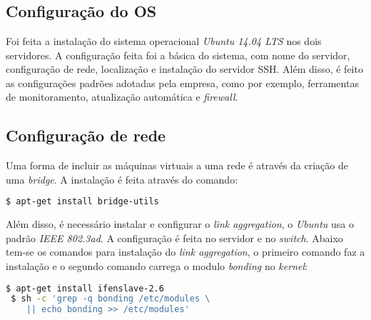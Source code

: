 
\chapter{}
\label{cap:apconfiguracao}

\section{Configuração do \ac{OS}}
\label{ap:confos}

Foi feita a instalação do sistema operacional \textit{Ubuntu 14.04 \ac{LTS}} nos dois servidores. A configuração feita foi a básica do sistema,
com nome do servidor, configuração de rede, localização e instalação do servidor \ac{SSH}.
Além disso, é feito as configurações padrões adotadas pela empresa, como por exemplo, ferramentas de monitoramento, atualização automática
e \textit{firewall}.

\section{Configuração de rede}
\label{ap:confrede}

Uma forma de incluir as máquinas virtuais a uma rede é através da criação de uma \textit{bridge}. A instalação é feita através do comando:
\begin{lstlisting}[language=bash]
  $ apt-get install bridge-utils
\end{lstlisting}

Além disso, é necessário instalar e configurar o \textit{link aggregation}, o \textit{Ubuntu} usa o padrão \textit{IEEE 802.3ad}. A configuração 
é feita no servidor e no \textit{switch}. Abaixo tem-se os comandos para instalação do \textit{link aggregation}, o primeiro comando faz a 
instalação e o segundo comando carrega o modulo \textit{bonding} no \textit{kernel}:
\begin{lstlisting}[language=bash]
 $ apt-get install ifenslave-2.6
 $ sh -c 'grep -q bonding /etc/modules \
    || echo bonding >> /etc/modules'
\end{lstlisting}

